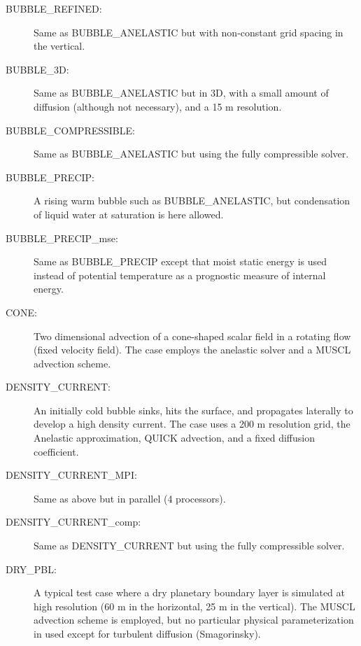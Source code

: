 \documentclass[12pt,A4,french]{article}
\begin{document}
\begin{description}
\item[BUBBLE\_REFINED:]

Same as BUBBLE\_ANELASTIC but with non-constant grid spacing in the vertical.

\item[BUBBLE\_3D:]

Same as BUBBLE\_ANELASTIC but in 3D, with a small amount of diffusion (although not necessary), and a 15 m resolution.

\item[BUBBLE\_COMPRESSIBLE:]

Same as BUBBLE\_ANELASTIC but using the fully compressible solver.

\item[BUBBLE\_PRECIP:]

A rising warm bubble such as BUBBLE\_ANELASTIC, but condensation of liquid water at saturation is here allowed.

\item[BUBBLE\_PRECIP\_mse:]

Same as BUBBLE\_PRECIP except that moist static energy is used instead of potential temperature as a prognostic measure of internal energy.

\item[CONE:]

Two dimensional advection of a cone-shaped scalar field in a rotating flow (fixed velocity field). The case employs the anelastic solver and a MUSCL advection scheme.

\item[DENSITY\_CURRENT:]

An initially cold bubble sinks, hits the surface, and propagates laterally to develop a high density current. The case uses a 200 m resolution grid, the Anelastic approximation, QUICK advection, and a fixed diffusion coefficient.

\item[DENSITY\_CURRENT\_MPI:]

Same as above but in parallel (4 processors).

\item[DENSITY\_CURRENT\_comp:]

Same as DENSITY\_CURRENT but using the fully compressible solver. 

\item[DRY\_PBL:]

A typical test case where a dry planetary boundary layer is simulated at high resolution (60 m in the horizontal, 25 m in the vertical). The MUSCL advection scheme is employed, but no particular physical parameterization in used except for turbulent diffusion (Smagorinsky).


\end{description}
\end{document}
